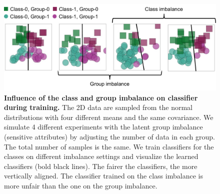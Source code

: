 


\begin{figure}[t]
    \centering
    \includegraphics[width=1.0\linewidth]{figures/fairness_toy_exp_2.pdf}
    \caption{\textbf{Influence of the class and group imbalance on classifier during training.} 
    The 2D data are sampled from the normal distributions with four different means and the same covariance. 
    We simulate 4 different experiments with the latent group imbalance (sensitive attributes) by adjusting the number of data in each group.
    The total number of samples is the same.
    We train classifiers for the classes on different imbalance settings and visualize the learned classifiers (bold black lines).
    The fairer the classifiers, the more vertically aligned.
    The classifier trained on the class imbalance is more unfair than the one on the group imbalance.
    }
    \label{fig:fair_toy}
\end{figure}



